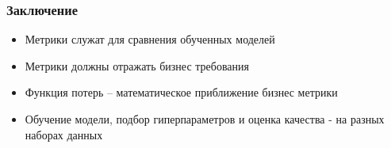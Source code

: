 \documentclass{beamer}
\begin{document}
	\begin{frame}
		\frametitle{Заключение}
		\begin{itemize}
			\item Метрики служат для сравнения обученных моделей
			\item Метрики должны отражать бизнес требования
			\item Функция потерь -- математическое приближение бизнес метрики
			\item Обучение модели, подбор гиперпараметров и оценка качества - на разных наборах данных
			
		\end{itemize}
	\end{frame}
	
	
\end{document}
